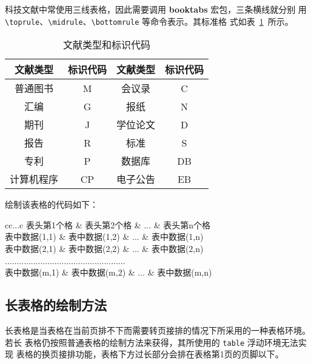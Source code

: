 科技文献中常使用三线表格，因此需要调用 \textbf{booktabs} 宏包，三条横线就分别
用 \verb|\toprule|、\verb|\midrule|、\verb|\bottomrule| 等命令表示。其标准格
式如表~\ref{table1}~所示。

\begin{table}[htbp]
\caption{文献类型和标识代码}
\label{table1}
\centering
\begin{tabular}{cccc}
\toprule
文献类型 & 标识代码 & 文献类型 & 标识代码\\
\midrule
普通图书 & M &  会议录 & C\\
汇编 & G & 报纸 & N\\
期刊 & J & 学位论文 & D\\
报告 & R & 标准 & S\\
专利 & P & 数据库 & DB\\
计算机程序 & CP & 电子公告 & EB\\
\bottomrule
\end{tabular}
\end{table}

绘制该表格的代码如下：
\begin{code}
\begin{table}[htbp]
\caption{表格标题}
\label{标签名}
\centering
\begin{tabular}{cc...c}
\toprule
表头第1个格   & 表头第2个格   & ... & 表头第n个格  \\
\midrule
表中数据(1,1) & 表中数据(1,2) & ... & 表中数据(1,n)\\
表中数据(2,1) & 表中数据(2,2) & ... & 表中数据(2,n)\\
...................................................\\
表中数据(m,1) & 表中数据(m,2) & ... & 表中数据(m,n)\\
\bottomrule
\end{tabular}
\end{table}
\end{code}

\subsection{长表格的绘制方法}

长表格是当表格在当前页排不下而需要转页接排的情况下所采用的一种表格环境。若长
表格仍按照普通表格的绘制方法来获得，其所使用的 \verb|table| 浮动环境无法实现
表格的换页接排功能，表格下方过长部分会排在表格第1页的页脚以下。

